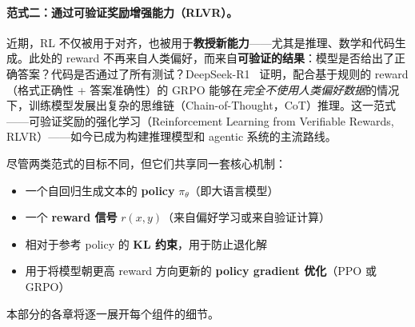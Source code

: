 \paragraph{范式二：通过可验证奖励增强能力（RLVR）。}
近期，RL 不仅被用于对齐，也被用于\textbf{教授新能力}——尤其是推理、数学和代码生成。此处的 reward 不再来自人类偏好，而来自\textbf{可验证的结果}：模型是否给出了正确答案？代码是否通过了所有测试？DeepSeek-R1~\cite{deepseek2025r1} 证明，配合基于规则的 reward（格式正确性 + 答案准确性）的 GRPO 能够在\emph{完全不使用人类偏好数据}的情况下，训练模型发展出复杂的思维链（Chain-of-Thought，CoT）推理。这一范式——可验证奖励的强化学习（Reinforcement Learning from Verifiable Rewards, RLVR）——如今已成为构建推理模型和 agentic 系统的主流路线。

\begin{keybox}[共同的底层基础]
尽管两类范式的目标不同，但它们共享同一套核心机制：
\begin{itemize}
  \item 一个自回归生成文本的 \textbf{policy} $\pi_\theta$（即大语言模型）
  \item 一个 \textbf{reward 信号} $r(x, y)$（来自偏好学习或来自验证计算）
  \item 相对于参考 policy 的 \textbf{KL 约束}，用于防止退化解
  \item 用于将模型朝更高 reward 方向更新的 \textbf{policy gradient 优化}（PPO 或 GRPO）
\end{itemize}
本部分的各章将逐一展开每个组件的细节。
\end{keybox}

